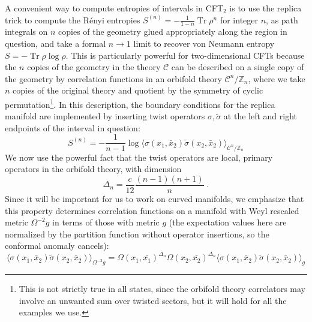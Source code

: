 \documentclass[12pt]{article}
\DeclareMathOperator{\Tr}{Tr}
\newcommand{\ZZ}{\mathbb{Z}}
\begin{document}
A convenient way to compute entropies of intervals in CFT$_2$ is to use the replica trick to compute the R\'enyi entropies $S^{(n)} = -\frac{1}{1-n}\Tr \rho^n$ for integer $n$, as path integrals on $n$ copies of the geometry glued appropriately along the region in question, and take a formal $n\to 1$ limit to recover von Neumann entropy $S=-\Tr \rho\log\rho$. This is particularly powerful for two-dimensional CFTs \cite{Calabrese:2009qy}  because the $n$ copies of the geometry in the theory $\mathcal{C}$ can be described on a single copy of the geometry by correlation functions in an orbifold theory $\mathcal{C}^n/\ZZ_n$, where we take $n$ copies of the original theory and quotient by the symmetry of cyclic permutation\footnote{This is not strictly true in all states, since the orbifold theory correlators may involve an unwanted sum over twisted sectors, but it will hold for all the examples we use.}. In this description, the boundary conditions for the replica manifold are implemented by inserting twist operators $\sigma,\tilde{\sigma}$ at the left and right endpoints of the interval in question:
\begin{equation}
	S^{(n)} = -\frac{1}{n-1} \log \langle\sigma(x_1,\bar{x}_2)\tilde{\sigma}(x_2,\bar{x}_2)\rangle_{\mathcal{C}^n/\ZZ_n}
\end{equation}
We now use the powerful fact that the twist operators are local, primary operators in the orbifold theory, with dimension
\begin{equation}
	\Delta_n = \frac{c}{12}\frac{(n-1)(n+1)}{n} \; .
\end{equation} Since it will be important for us to work on curved manifolds, we emphasize that this property determines correlation functions on a manifold with Weyl rescaled metric $\Omega^{-2}g$ in terms of those with metric $g$ (the expectation values here are normalized by the partition function without operator insertions, so the conformal anomaly cancels):
\begin{equation}\label{eq:sigmaPrim}
	\langle\sigma(x_1,\bar{x}_2)\tilde{\sigma}(x_2,\bar{x}_2)\rangle_{\Omega^{-2}g} = \Omega(x_1,\bar{x_1})^{\Delta_n} \Omega(x_2,\bar{x_2})^{\Delta_n}\langle\sigma(x_1,\bar{x}_2)\tilde{\sigma}(x_2,\bar{x}_2)\rangle_{g}
\end{equation}
\end{document}
